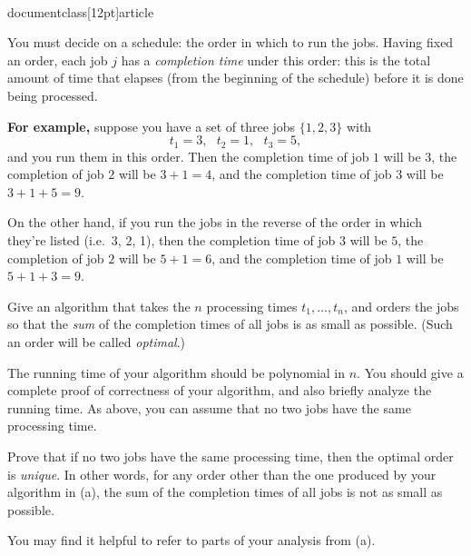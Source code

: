 \\documentclass[12pt]{article}
\begin{document}
\begin{enumerate}
You must decide on a schedule:
the order in which to run the jobs.
Having fixed an order, each job $j$ has a
{\em completion time} under this order:
this is the total amount of time that elapses
(from the beginning of the schedule) before it is
done being processed.

\bigskip
{\bf For example,} suppose you have a set of three jobs $\{1, 2, 3\}$
with
$$t_1 = 3, ~~~ t_2 = 1, ~~~ t_3 = 5,$$
and you run them in this order.
Then the completion time of job $1$ will be $3$,
the completion of job $2$ will be $3 + 1 = 4$,
and the completion time of job $3$ will be $3 + 1 + 5 = 9$.

On the other hand, if you run the jobs in the reverse
of the order in which they're listed (i.e.~3, 2, 1), then
the completion time of job $3$ will be $5$,
the completion of job $2$ will be $5 + 1 = 6$,
and the completion time of job $1$ will be $5 + 1 + 3 = 9$.

\bigskip

Give an algorithm that takes the $n$ processing times
$t_1, \ldots, t_n$, and orders the jobs so that
the {\em sum} of the completion times of all jobs
is as small as possible.
(Such an order will be called {\em optimal}.)

The running time of your algorithm should be polynomial in $n$.
You should give a complete proof of correctness of your algorithm,
and also briefly analyze the running time.
As above, you can assume that no two jobs have the same processing time.

Prove that if no two jobs have the same processing time,
then the optimal order is {\em unique}.
In other words, for any order other than
the one produced by your algorithm in (a),
the sum of the completion times of all jobs
is not as small as possible.

You may find it helpful to refer to parts of your analysis from (a).

\end{enumerate}
\end{document}
